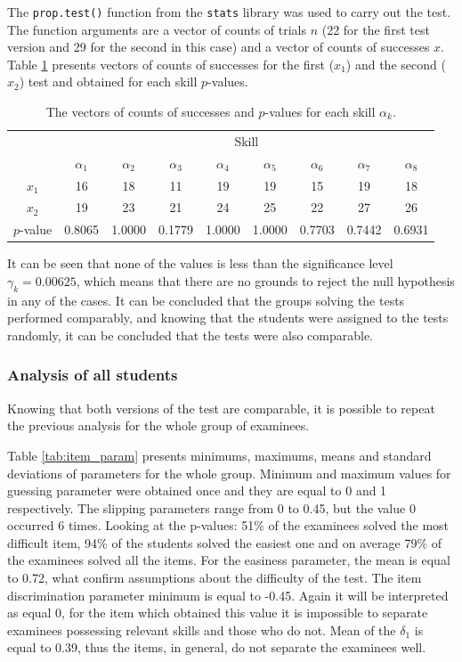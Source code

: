 \documentclass[english]{pwr_wmat_praca_dyplomowa}
\theoremstyle{plain}
\theoremstyle{definition}
\numberwithin{theorem}{chapter}
\begin{document}
The \texttt{prop.test()} function from the \texttt{stats} library was used to carry out the test. The function arguments are a vector of counts of trials $n$ (22 for the first test version and 29 for the second in this case) and a vector of counts of successes $x$. Table \ref{tab:p_values_groups_comparison} presents vectors of counts of successes for the first ($x_1$) and the second ($x_2$) test and obtained for each skill $p$-values.

\begin{table}[H]
	\centering
	\begin{tabular}{c c c c c c c c c} 
		\hline
		{\rule{0pt}{3ex}} & \multicolumn{8}{c}{Skill} \\
		& $\alpha_1$ & $\alpha_2$ & $\alpha_3$ &  $\alpha_4$ & $\alpha_5$ & $\alpha_6$ & $\alpha_7$ & $\alpha_8$ \\
		\hline
		{\rule{0pt}{3ex}}$x_1$ & 16 & 18 & 11 & 19 & 19 & 15 & 19 & 18 \\
		$x_2$ & 19 & 23 & 21 & 24 & 25 & 22 & 27 & 26 \\
		$p$-value & 0.8065 & 1.0000 & 0.1779 & 1.0000 & 1.0000 & 0.7703 & 0.7442 & 0.6931 \\ [0.5ex] 
		\hline
	\end{tabular}
	\caption{The vectors of counts of successes and $p$-values for each skill $\alpha_{k}$.}
	\label{tab:p_values_groups_comparison} 
\end{table}

It can be seen that none of the values is less than the significance level $\gamma_k = 0.00625$, which means that there are no grounds to reject the null hypothesis in any of the cases. It can be concluded that the groups solving the tests performed comparably, and knowing that the students were assigned to the tests randomly, it can be concluded that the tests were also comparable.

\subsubsection{Analysis of all students}

Knowing that both versions of the test are comparable, it is possible to repeat the previous analysis for the whole group of examinees.

Table \ref{tab:item_param} presents minimums, maximums, means and standard deviations of parameters for the whole group. Minimum and maximum values for guessing parameter were obtained once and they are equal to 0 and 1 respectively. The slipping parameters range from 0 to 0.45, but the value 0 occurred 6 times. Looking at the p-values: 51\% of the examinees solved the most difficult item, 94\% of the students solved the easiest one and on average 79\% of the examinees solved all the items. For the easiness parameter, the mean is equal to 0.72, what confirm assumptions about the difficulty of the test. The item discrimination parameter minimum is equal to -0.45. Again it will be interpreted as equal 0, for the item which obtained this value it is impossible to separate examinees possessing relevant skills and those who do not. Mean of the $\delta_1$ is equal to 0.39, thus the items, in general, do not separate the examinees well.
\end{document}
